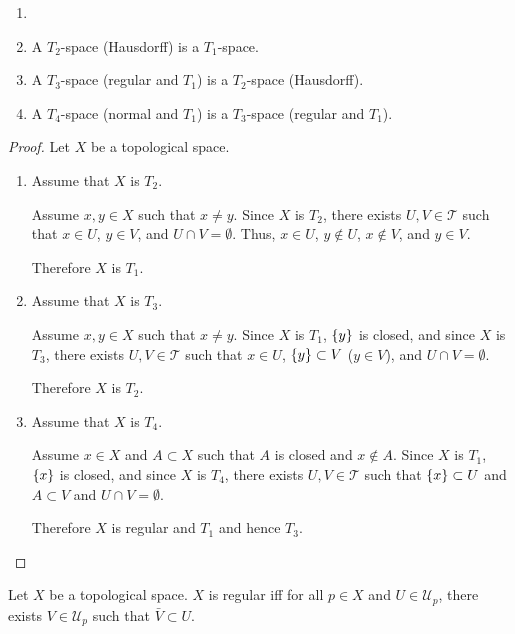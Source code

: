 \documentclass[letterpaper,12pt,fleqn]{article}
\newcommand{\T}{\mathscr{T}}
\newcommand{\U}{\mathcal{U}}
\begin{document}
\begin{theorem}[4.7]
  \begin{enumerate}
  \item[]
  \item A \(T_2\)-space (Hausdorff) is a \(T_1\)-space.
  \item A \(T_3\)-space (regular and \(T_1\)) is a \(T_2\)-space (Hausdorff).
  \item A \(T_4\)-space (normal and \(T_1\)) is a \(T_3\)-space (regular and \(T_1\)).
  \end{enumerate}
\end{theorem}

\begin{proof}
  Let \(X\) be a topological space.
  \begin{enumerate}
  \item Assume that \(X\) is \(T_2\).

    Assume \(x,y\in X\) such that \(x\ne y\).  Since \(X\) is \(T_2\), there exists \(U,V\in\T\) such that
    \(x\in U\), \(y\in V\), and \(U\cap V=\emptyset\).  Thus, \(x\in U\), \(y\notin U\), \(x\notin V\), and
    \(y\in V\).

    Therefore \(X\) is \(T_1\).

  \item Assume that \(X\) is \(T_3\).
    
    Assume \(x,y\in X\) such that \(x\ne y\).  Since \(X\) is \(T_1\), \(\{y\}\) is closed, and since \(X\) is
    \(T_3\), there exists \(U,V\in\T\) such that \(x\in U\), \(\{y\}\subset V\) (\(y\in V\)), and
    \(U\cap V=\emptyset\).

    Therefore \(X\) is \(T_2\).

  \item Assume that \(X\) is \(T_4\).

    Assume \(x\in X\) and \(A\subset X\) such that \(A\) is closed and \(x\notin A\).  Since \(X\) is \(T_1\),
    \(\{x\}\) is closed, and since \(X\) is \(T_4\), there exists \(U,V\in\T\) such that \(\{x\}\subset U\)
    and \(A\subset V\) and \(U\cap V=\emptyset\).

    Therefore \(X\) is regular and \(T_1\) and hence \(T_3\).
  \end{enumerate}
\end{proof}

\begin{theorem}[4.8]
  Let \(X\) be a topological space.  \(X\) is regular iff for all \(p\in X\) and \(U\in\U_p\), there exists
  \(V\in\U_p\) such that \(\bar{V}\subset U\).
\end{theorem}
\end{document}
